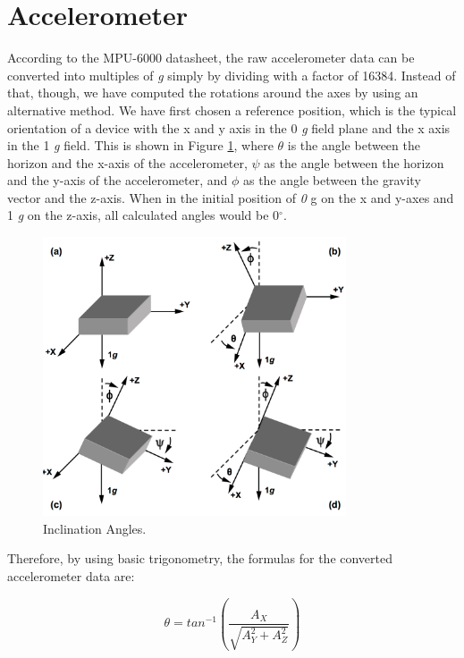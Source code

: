 \section{Accelerometer}\label{accelEqs}
According to the MPU-6000 datasheet\cite{MPU6000}, the raw accelerometer data can be converted into multiples of \textit{g} simply by dividing with a factor of 16384. Instead of that, though, we have computed the rotations around the axes by using an alternative method. We have first chosen a reference position, which is the typical orientation of a device with the x and y axis in the 0 \textit{g} field plane and the x axis in the 1 \textit{g} field. This is shown in Figure \ref{acc}, where $\theta$ is the angle between the horizon and the x-axis of the accelerometer, $\psi$ as the angle between the horizon and the y-axis of the accelerometer, and
$\phi$ as the angle between the gravity vector and the z-axis. When in the initial position of \textit{0} g on the x and y-axes and 1 \textit{g} on the z-axis, all calculated angles would be 0$^{\circ}$.\cite{AccelCite1}

\begin{figure}[H]
  \centering
    \includegraphics[width=0.8\textwidth]{images/accangle.png}
	\caption{Inclination Angles. \cite{AccelCite1}}
	\label{acc}
\end{figure} 

Therefore, by using basic trigonometry, the formulas for the converted accelerometer data are:

\begin{equation}	
 	\theta=tan^{-1}\left(\frac{A_{X}}{\sqrt{A_{Y}^{2}+A_{Z}^{2}}}\right)
 \end{equation}
 
